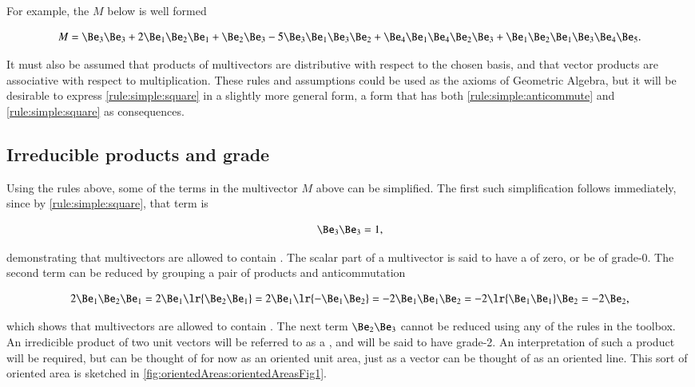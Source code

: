 
For example, the  \( M \) below is well formed

\begin{equation}\label{eqn:SimpleProducts:20}
M = \Be_3 \Be_3 + 2 \Be_1 \Be_2 \Be_1 + \Be_2 \Be_3 - 5 \Be_3 \Be_1 \Be_3 \Be_2 + \Be_4 \Be_1 \Be_4 \Be_2 \Be_3 + \Be_1 \Be_2 \Be_1 \Be_3 \Be_4 \Be_5.
\end{equation}

It must also be assumed that products of multivectors are distributive with respect to the chosen basis, and that vector products are associative with respect to multiplication.  These rules and assumptions could be used as the axioms of Geometric Algebra, but it will be desirable to express \ref{rule:simple:square} in a slightly more general form, a form that has both \ref{rule:simple:anticommute} and \ref{rule:simple:square} as consequences.

\subsection{Irreducible products and grade}

Using the rules above, some of the terms in the multivector \( M \) above can be simplified.  The first such simplification follows immediately, since by \ref{rule:simple:square}, that term is

\begin{equation}\label{eqn:SimpleProducts:40}
\Be_3 \Be_3 = 1,
\end{equation}

demonstrating that multivectors are allowed to contain .  The scalar part of a multivector is said to have a  of zero, or be of grade-0.  The second term can be reduced by grouping a pair of products and anticommutation

\begin{dmath}\label{eqn:SimpleProducts:60}
2 \Be_1 \Be_2 \Be_1
=
2 \Be_1 \lr{ \Be_2 \Be_1 }
=
2 \Be_1 \lr{ - \Be_1 \Be_2 }
=
-2 \Be_1 \Be_1 \Be_2
=
-2 \lr{ \Be_1 \Be_1 } \Be_2
=
-2 \Be_2,
\end{dmath}

which shows that multivectors are allowed to contain .
The next term \( \Be_2 \Be_3 \) cannot be reduced using any of the rules in the toolbox.  An irredicible product of two unit vectors will be referred to as a , and will be said to have grade-2.  An interpretation of such a product will be required, but can be thought of for now as an oriented unit area, just as a vector can be thought of as an oriented line.  This sort of oriented area is sketched in
\cref{fig:orientedAreas:orientedAreasFig1}.

